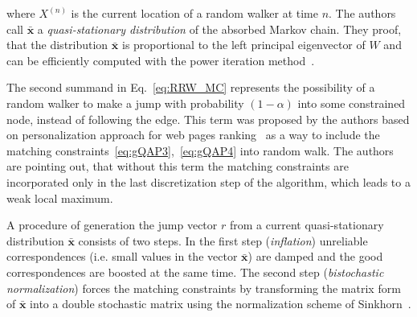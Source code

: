 where $X^{(n)}$ is the current location of a random walker at time $n$. The authors call $\mathbf{\bar{x}}$ a \emph{quasi-stationary distribution} of the absorbed Markov chain. They proof, that the distribution $\mathbf{\bar{x}}$ is proportional to the left principal eigenvector of $W$ and can be efficiently computed with the power iteration method~\cite{PowerIteration}.

The second summand in Eq.~\eqref{eq:RRW_MC} represents the possibility of a random walker to make a jump with probability $(1-\alpha)$ into some constrained node, instead of following the edge. This term was proposed by the authors based on personalization approach for web pages ranking~\cite{Langville2003} as a way to include the matching constraints~\eqref{eq:gQAP3},~\eqref{eq:gQAP4} into random walk. The authors are pointing out, that without this term the matching constraints are incorporated only in the last discretization step of the algorithm, which leads to a weak local maximum. 

A procedure of generation the jump vector $r$ from a current quasi-stationary distribution $\mathbf{\bar{x}}$ consists of two steps. In the first step (\emph{inflation}) unreliable correspondences (i.e. small values in the vector $\mathbf{\bar{x}}$) are damped and the good correspondences are boosted at the same time. The second step (\emph{bistochastic normalization}) forces the matching constraints by transforming the matrix form of $\mathbf{\bar{x}}$ into a double stochastic matrix using the normalization scheme of Sinkhorn~\cite{Sinkhorn1964}. 

